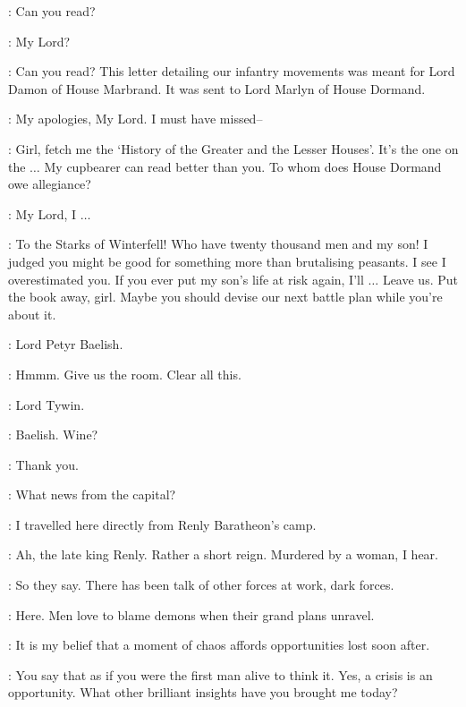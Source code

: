 \TYWIN: Can you read? 

\AMORY: My Lord? 

\TYWIN: Can you read?  This letter detailing our infantry movements was meant for Lord Damon of House Marbrand. It was sent to Lord Marlyn of House Dormand. 

\AMORY: My apologies, My Lord. I must have missed--

\TYWIN: Girl, fetch me the `History of the Greater and the Lesser Houses'. It's the one on the $\ldots$  My cupbearer can read better than you. To whom does House Dormand owe allegiance? 

\AMORY: My Lord, I $\ldots$ 

\TYWIN: To the Starks of Winterfell! Who have twenty thousand men and my son! I judged you might be good for something more than brutalising peasants. I see I overestimated you. If you ever put my son's life at risk again, I'll $\ldots$ Leave us.  Put the book away, girl.  Maybe you should devise our next battle plan while you're about it. 

\HERALD: Lord Petyr Baelish. 

\TYWIN: Hmmm. Give us the room.  Clear all this. 


\LITTLEFINGER: Lord Tywin. 

\TYWIN: Baelish. Wine? 

\LITTLEFINGER: Thank you. 

\TYWIN: What news from the capital? 

\LITTLEFINGER: I travelled here directly from Renly Baratheon's camp. 

\TYWIN: Ah, the late king Renly. Rather a short reign. Murdered by a woman, I hear. 


\LITTLEFINGER: So they say. There has been talk of other forces at work, dark forces. 

\TYWIN:  Here.  Men love to blame demons when their grand plans unravel. 

\LITTLEFINGER: It is my belief that a moment of chaos affords opportunities lost soon after. 

\TYWIN: You say that as if you were the first man alive to think it. Yes, a crisis is an opportunity. What other brilliant insights have you brought me today? 

